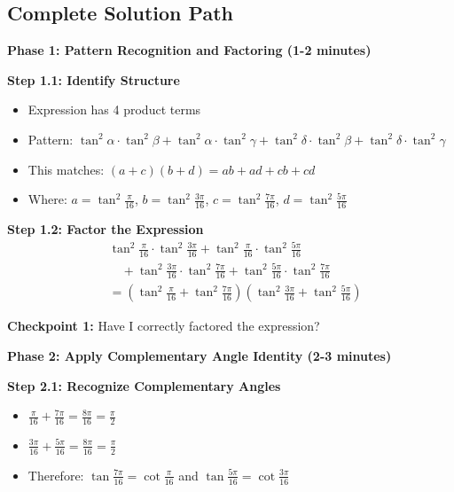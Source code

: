 \documentclass[12pt]{article}
\begin{document}
\begin{solutionbox}

\subsection*{Complete Solution Path}

\textbf{Phase 1: Pattern Recognition and Factoring (1-2 minutes)}

\textbf{Step 1.1: Identify Structure}
\begin{itemize}
    \item Expression has 4 product terms
    \item Pattern: $\tan^2 \alpha \cdot \tan^2 \beta + \tan^2 \alpha \cdot \tan^2 \gamma + \tan^2 \delta \cdot \tan^2 \beta + \tan^2 \delta \cdot \tan^2 \gamma$
    \item This matches: $(a+c)(b+d) = ab + ad + cb + cd$
    \item Where: $a = \tan^2\frac{\pi}{16}$, $b = \tan^2\frac{3\pi}{16}$, $c = \tan^2\frac{7\pi}{16}$, $d = \tan^2\frac{5\pi}{16}$
\end{itemize}

\textbf{Step 1.2: Factor the Expression}
\begin{align*}
&\tan^2 \frac {\pi}{16} \cdot \tan^2 \frac {3\pi}{16} + \tan^2 \frac {\pi}{16} \cdot \tan^2 \frac {5\pi}{16} \\
&\quad +\tan^2 \frac {3\pi}{16} \cdot \tan^2 \frac {7\pi}{16}+\tan^2 \frac {5\pi}{16} \cdot \tan^2 \frac {7\pi}{16} \\
&= \left(\tan^2\frac{\pi}{16}+\tan^2 \frac{7\pi}{16}\right)\left(\tan^2\frac{3\pi}{16}+\tan^2 \frac{5\pi}{16}\right)
\end{align*}

\textbf{Checkpoint 1:} Have I correctly factored the expression?

\textbf{Phase 2: Apply Complementary Angle Identity (2-3 minutes)}

\textbf{Step 2.1: Recognize Complementary Angles}
\begin{itemize}
    \item $\frac{\pi}{16} + \frac{7\pi}{16} = \frac{8\pi}{16} = \frac{\pi}{2}$
    \item $\frac{3\pi}{16} + \frac{5\pi}{16} = \frac{8\pi}{16} = \frac{\pi}{2}$
    \item Therefore: $\tan\frac{7\pi}{16} = \cot\frac{\pi}{16}$ and $\tan\frac{5\pi}{16} = \cot\frac{3\pi}{16}$
\end{itemize}


\end{solutionbox}
\end{document}
